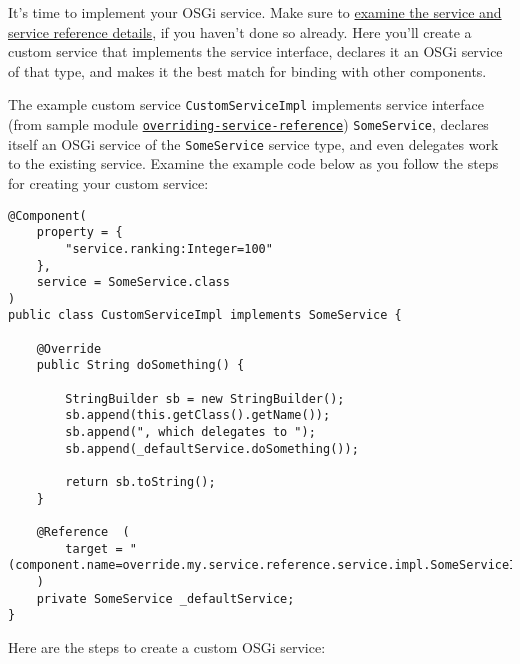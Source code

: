 It's time to implement your OSGi service. Make sure to
\href{/docs/7-2/customization/-/knowledge_base/c/examining-an-osgi-service-to-override}{examine
the service and service reference details}, if you haven't done so
already. Here you'll create a custom service that implements the service
interface, declares it an OSGi service of that type, and makes it the
best match for binding with other components.

The example custom service \texttt{CustomServiceImpl} implements service
interface (from sample module
\href{https://portal.liferay.dev/documents/113763090/114000186/overriding-service-reference.zip}{\texttt{overriding-service-reference}})
\texttt{SomeService}, declares itself an OSGi service of the
\texttt{SomeService} service type, and even delegates work to the
existing service. Examine the example code below as you follow the steps
for creating your custom service:

\begin{verbatim}
@Component(
    property = {
        "service.ranking:Integer=100"
    },
    service = SomeService.class
)
public class CustomServiceImpl implements SomeService {

    @Override
    public String doSomething() {

        StringBuilder sb = new StringBuilder();
        sb.append(this.getClass().getName());
        sb.append(", which delegates to ");
        sb.append(_defaultService.doSomething());

        return sb.toString();
    }

    @Reference  (
        target = "(component.name=override.my.service.reference.service.impl.SomeServiceImpl)"
    )
    private SomeService _defaultService;
}
\end{verbatim}

Here are the steps to create a custom OSGi service:

